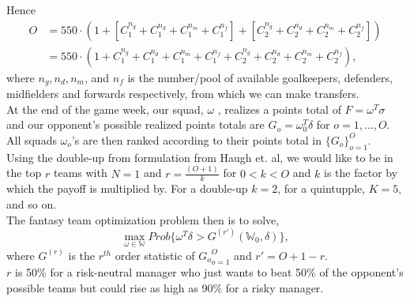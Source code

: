 \documentclass[12pt,oneside,a4paper]{book}
\theoremstyle{definition}
\theoremstyle{remark}
\begin{document}
					Hence
					\begin{equation*}
						\begin{aligned}
							O &= 550 \cdot (1 + [C_1^{n_g} +C_1^{n_d}+C_1^{n_m} +C_1^{n_f}] + [C_2^{n_g} +C_2^{n_d}+C_2^{n_m} +C_2^{n_f}])\\
							&= 550 \cdot  (1 + C_1^{n_g} +C_1^{n_d}+C_1^{n_m} +C_1^{n_f} + C_2^{n_g} +C_2^{n_d}+C_2^{n_m} +C_2^{n_f}),
						\end{aligned}
					\end{equation*}
					where $n_g,n_d,n_m$, and $n_f$ is the number/pool of available goalkeepers, defenders, midfielders and forwards respectively, from which we can make transfers. \\

					At the end of the game week, our squad, $\omega$ , realizes a points total of $F=\omega^T\sigma$ and our opponent’s possible realized points totals are $G_o=\omega_0^T\delta$  for $o = 1,\dots,O$. All squads $\omega_o$’s are then ranked according to their points total in $\{G_o\}^O_{o=1}$.\\

					Using the double-up from formulation from Haugh et. al, we would like to be in the top $r$ teams with $N=1$ and $r =\frac{(O+1)}{k}$ for $0 < k<O$ and $k$ is the factor by which the payoff is multiplied by. For a double-up $k=2$, for a quintupple, $K=5$, and so on.\\
					The fantasy team optimization problem then is to solve,
					\[
					\max_{\omega \in \mathbb{W}} Prob\{\omega^T\delta > G^{(r')}(\mathbb{W}_0,\delta)\},
					\]
					where $G^{(r)}$ is the $r^{th}$ order statistic of ${G_o}_{o=1}^O$ and $r' =O+1-r$.\\
					$r$ is 50\% for a risk-neutral manager who just wants to beat 50\% of the opponent's possible teams but could rise as high as 90\% for a risky manager.
\end{document}
